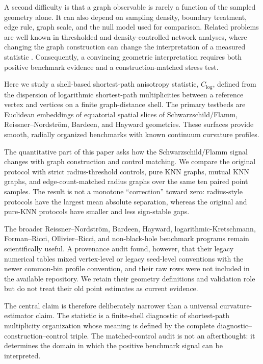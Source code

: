 \documentclass[11pt,a4paper]{article}
\begin{document}
A second difficulty is that a graph observable is rarely a function of the sampled geometry alone. It can also depend on sampling density, boundary treatment, edge rule, graph scale, and the null model used for comparison. Related problems are well known in thresholded and density-controlled network analyses, where changing the graph construction can change the interpretation of a measured statistic \cite{VanWijk2010,Langer2013,Ginestet2011}. Consequently, a convincing geometric interpretation requires both positive benchmark evidence and a construction-matched stress test.

Here we study a shell-based shortest-path anisotropy statistic, $C_{\log}$, defined from the dispersion of logarithmic shortest-path multiplicities between a reference vertex and vertices on a finite graph-distance shell. The primary testbeds are Euclidean embeddings of equatorial spatial slices of Schwarzschild/Flamm, Reissner--Nordstr\"om, Bardeen, and Hayward geometries. These surfaces provide smooth, radially organized benchmarks with known continuum curvature profiles.

The quantitative part of this paper asks how the Schwarzschild/Flamm signal changes with graph construction and control matching. We compare the original protocol with strict radius-threshold controls, pure KNN graphs, mutual KNN graphs, and edge-count-matched radius graphs over the same ten paired point samples. The result is not a monotone ``correction'' toward zero: radius-style protocols have the largest mean absolute separation, whereas the original and pure-KNN protocols have smaller and less sign-stable gaps.

The broader Reissner--Nordstr\"om, Bardeen, Hayward, logarithmic-Kretschmann, Forman--Ricci, Ollivier--Ricci, and non-black-hole benchmark programs remain scientifically useful. A provenance audit found, however, that their legacy numerical tables mixed vertex-level or legacy seed-level conventions with the newer common-bin profile convention, and their raw rows were not included in the available repository. We retain their geometry definitions and validation role but do not treat their old point estimates as current evidence.

The central claim is therefore deliberately narrower than a universal curvature-estimator claim. The statistic is a finite-shell diagnostic of shortest-path multiplicity organization whose meaning is defined by the complete diagnostic--construction--control triple. The matched-control audit is not an afterthought: it determines the domain in which the positive benchmark signal can be interpreted.
\end{document}
